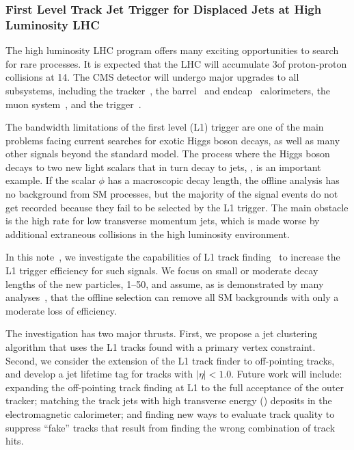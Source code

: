 \subsubsection{First Level Track Jet Trigger for Displaced Jets at High Luminosity LHC}

The high luminosity LHC program offers many exciting opportunities to search for rare processes. It is expected that the
LHC will accumulate 3\abinv of proton-proton collisions at 14\UTeV.
The CMS detector will undergo major upgrades to all subsystems, including the tracker~\cite{cmstdr-014},
the barrel~\cite{cmstdr-barrel} and endcap~\cite{cmstdr-ec} calorimeters, the muon system~\cite{cmstdr-mu},
and the trigger~\cite{cmstdr-017}. 

The bandwidth limitations of the first level (L1) trigger
are one of the main problems facing current searches 
for exotic Higgs boson decays, as well as many other signals beyond the standard model.
The process where the Higgs boson decays to two new light scalars that in turn decay to jets, \Hphiphi, is an important example. If the scalar $\phi$ has a
macroscopic decay length, the offline analysis has no background from SM processes, but the majority of the signal events do not get recorded because they fail to be selected by the L1 trigger.
The main obstacle is the high rate for low transverse momentum jets, which is made worse by additional extraneous \pp collisions in the
high luminosity environment.

In this note~\cite{CMS-PAS-FTR-18-018}, 
we investigate the capabilities of L1 track finding~\cite{cmstdr-014} to increase the L1 trigger efficiency for such signals.
We focus on small or moderate decay lengths of the new particles, 1--50\Umm, and assume, as is demonstrated by
many analyses~\cite{ll1, ll2, ll3}, that the offline selection can remove all SM backgrounds with only a moderate loss of efficiency.

The investigation has two major thrusts. First, we propose a jet clustering algorithm that uses the L1 tracks found with a primary vertex constraint.
Second, we consider the extension of the L1
track finder to off-pointing tracks, and develop a jet lifetime tag for tracks with $|\eta| < 1.0$. 
Future work will include: expanding the off-pointing track finding at L1 to the full acceptance of the outer tracker;
matching the track jets with high transverse energy (\ET) deposits in the electromagnetic calorimeter; and finding new ways to evaluate
track quality to suppress ``fake'' tracks that result from finding the wrong combination of track hits. 

